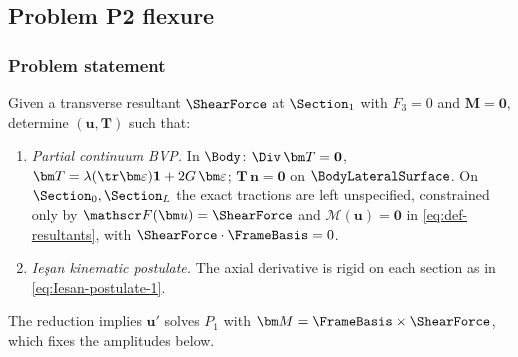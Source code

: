 \subsection{Problem P2 flexure}

\subsubsection*{Problem statement}
Given a transverse resultant \(\ShearForce\) at \(\Section_1\) with \(F_3=0\) and \(\bm M=\mathbf{0}\), determine \((\bm u,\bm T)\) such that:
\begin{enumerate}
  \item \textit{Partial continuum BVP.} In \(\Body\): \(\Div\,\bm T=\mathbf{0}\), \(\bm T=\lambda(\tr\bm\varepsilon)\mathbf{1}+2G\,\bm\varepsilon\);
        \(\bm T\,\bm n=\mathbf{0}\) on \(\BodyLateralSurface\).
        On \(\Section_0,\Section_L\) the exact tractions are left unspecified, constrained only by
        \(\mathscr F(\bm u)=\ShearForce\) and \(\mathscr M(\bm u)=\mathbf{0}\) in \eqref{eq:def-resultants}, with \(\ShearForce\cdot\FrameBasis=0\).
  \item \textit{Ie\c{s}an kinematic postulate.} The axial derivative is rigid on each section as in \eqref{eq:Iesan-postulate-1}.
\end{enumerate}
The reduction implies \(\bm u'\) solves \(P_1\) with \(\bm M=\FrameBasis\times\ShearForce\), which fixes the amplitudes below.

